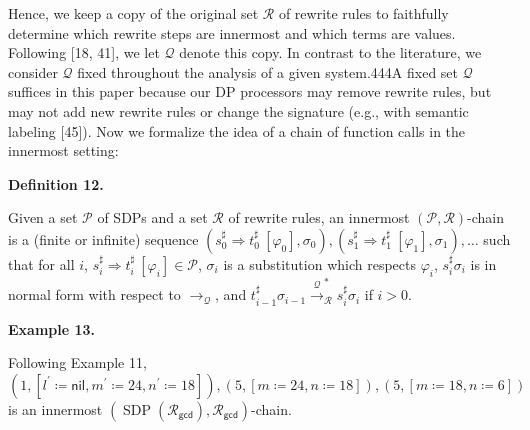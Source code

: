 \documentclass[10pt,a4paper]{amsart}
\providecommand{\coloneq}{\coloneqq}
\begin{document}
 
 
Hence, we keep a copy of the original set $\mathcal{R}$ of rewrite rules to faithfully determine which rewrite steps are innermost and which terms are values. Following [18, 41], we let $\mathcal{Q}$ denote this copy. In contrast to the literature, we consider $\mathcal{Q}$ fixed throughout the analysis of a given system.444A fixed set $\mathcal{Q}$ suffices in this paper because our DP processors may remove rewrite rules, but may not add new rewrite rules or change the signature (e.g., with semantic labeling [45]). Now we formalize the idea of a chain of function calls in the innermost setting:\par
 
 
 
\par\medskip\noindent\textbf{Definition 12.}\par
 
 
Given a set $\mathcal{P}$ of SDPs and a set $\mathcal{R}$ of rewrite rules, an innermost $(\mathcal{P},\mathcal{R})$-chain is a (finite or infinite) sequence $({s_{0}^{\sharp}}\Rightarrow{t_{0}^{\sharp}}\ [\varphi_{0}],\sigma_{0}),({s_{1}^{\sharp}}\Rightarrow{t_{1}^{\sharp}}\ [\varphi_{1}],\sigma_{1}),\ldots$ such that for all $i$, ${s_{i}^{\sharp}}\Rightarrow{t_{i}^{\sharp}}\ [\varphi_{i}]\in\mathcal{P}$, $\sigma_{i}$ is a substitution which respects $\varphi_{i}$, $s_{i}^{\sharp}\sigma_{i}$ is in normal form with respect to $\rightarrow_{\mathcal{Q}}$, and $t_{i-1}^{\sharp}\sigma_{i-1}\xrightarrow{\scriptscriptstyle\mathcal{Q}}_{\mathcal{R}}^{*}s_{i}^{\sharp}\sigma_{i}$ if $i>0$.\par
 
 
 
 
\par\medskip\noindent\textbf{Example 13.}\par
 
 
Following Example 11, $(\text{1},[{l^{\prime}}\coloneq{\mathsf{nil}},{m^{\prime}}\coloneq{24},{n^{\prime}}\coloneq{18}]),(\text{5},[{m}\coloneq{24},{n}\coloneq{18}]),(\text{5},[{m}\coloneq{18},{n}\coloneq{6}])$ is an innermost $(\operatorname{SDP}(\mathcal{R}_{\mathsf{gcd}}),\mathcal{R}_{\mathsf{gcd}})$-chain.\par
 
\end{document}
